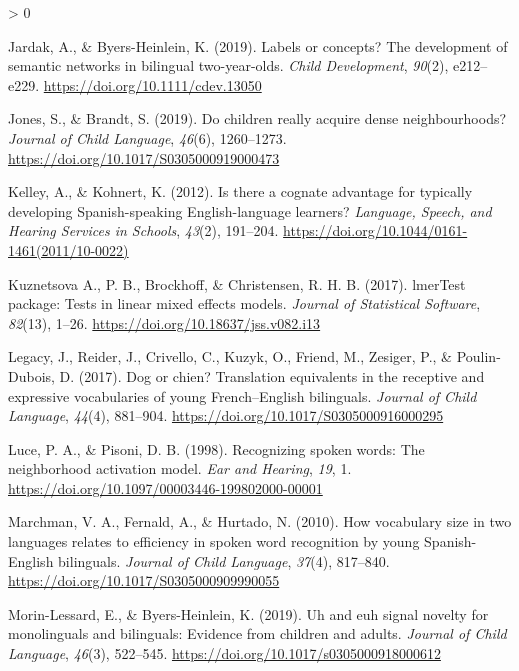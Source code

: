 \documentclass[
  english,
  ,man,floatsintext]{apa6}
\newlength{\cslhangindent}
\newenvironment{CSLReferences}[2] %
 {%
  \setlength{\parindent}{0pt}
  \ifodd #1 \everypar{\setlength{\hangindent}{\cslhangindent}}\ignorespaces\fi
  \ifnum #2 > 0
  \setlength{\parskip}{#2\baselineskip}
  \fi
 }%
 {}
\begin{document}
\begin{CSLReferences}{1}{0}
\leavevmode\hypertarget{ref-Jardak_Byers-Heinlein_2019}{}%
Jardak, A., \& Byers-Heinlein, K. (2019). Labels or concepts? The development of semantic networks in bilingual two-year-olds. \emph{Child Development}, \emph{90}(2), e212--e229. \url{https://doi.org/10.1111/cdev.13050}

\leavevmode\hypertarget{ref-Jones_Brandt_2019}{}%
Jones, S., \& Brandt, S. (2019). Do children really acquire dense neighbourhoods? \emph{Journal of Child Language}, \emph{46}(6), 1260--1273. \url{https://doi.org/10.1017/S0305000919000473}

\leavevmode\hypertarget{ref-Kelley_Kohnert_2012}{}%
Kelley, A., \& Kohnert, K. (2012). Is there a cognate advantage for typically developing {S}panish-speaking {E}nglish-language learners? \emph{Language, Speech, and Hearing Services in Schools}, \emph{43}(2), 191--204. \url{https://doi.org/10.1044/0161-1461(2011/10-0022)}

\leavevmode\hypertarget{ref-Kuznetsova_etal_2017}{}%
Kuznetsova A., P. B., Brockhoff, \& Christensen, R. H. B. (2017). lmerTest package: Tests in linear mixed effects models. \emph{Journal of Statistical Software}, \emph{82}(13), 1--26. \url{https://doi.org/10.18637/jss.v082.i13}

\leavevmode\hypertarget{ref-Legacy_etal_2017}{}%
Legacy, J., Reider, J., Crivello, C., Kuzyk, O., Friend, M., Zesiger, P., \& Poulin-Dubois, D. (2017). Dog or chien? Translation equivalents in the receptive and expressive vocabularies of young {F}rench--{E}nglish bilinguals. \emph{Journal of Child Language}, \emph{44}(4), 881--904. \url{https://doi.org/10.1017/S0305000916000295}

\leavevmode\hypertarget{ref-Luce_Pisoni_1998}{}%
Luce, P. A., \& Pisoni, D. B. (1998). Recognizing spoken words: The neighborhood activation model. \emph{Ear and Hearing}, \emph{19}, 1. \url{https://doi.org/10.1097/00003446-199802000-00001}

\leavevmode\hypertarget{ref-Marchman_etal_2010}{}%
Marchman, V. A., Fernald, A., \& Hurtado, N. (2010). How vocabulary size in two languages relates to efficiency in spoken word recognition by young {S}panish-{E}nglish bilinguals. \emph{Journal of Child Language}, \emph{37}(4), 817--840. \url{https://doi.org/10.1017/S0305000909990055}

\leavevmode\hypertarget{ref-Morin-Lessard_Byers-Heinlein_2019}{}%
Morin-Lessard, E., \& Byers-Heinlein, K. (2019). Uh and euh signal novelty for monolinguals and bilinguals: Evidence from children and adults. \emph{Journal of Child Language}, \emph{46}(3), 522--545. \url{https://doi.org/10.1017/s0305000918000612}


\end{CSLReferences}
\end{document}
